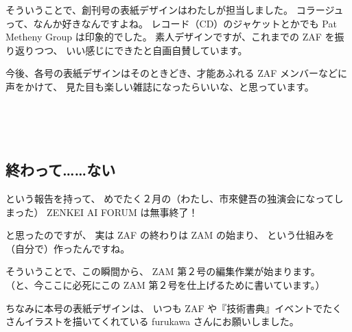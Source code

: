 \documentclass[dvipdfmx,autodetect-engine,10pt,b5paper,papersize,openany,dvipsnames]{jsbook}
\begin{document}
\vspace{8cm}

\begin{multicols}{2}

そういうことで、創刊号の表紙デザインはわたしが担当しました。
コラージュって、なんか好きなんですよね。
レコード（CD）のジャケットとかでも
Pat Metheny Group は印象的でした。
素人デザインですが、これまでの ZAF を振り返りつつ、
いい感じにできたと自画自賛しています。

今後、各号の表紙デザインはそのときどき、才能あふれる ZAF メンバーなどに声をかけて、
見た目も楽しい雑誌になったらいいな、と思っています。


\end{multicols}


\vspace{6cm}


\newpage

\begin{multicols}{2}

\section{終わって……ない}
という報告を持って、
めでたく２月の（わたし、市來健吾の独演会になってしまった）
ZENKEI AI FORUM は無事終了！

と思ったのですが、
実は ZAF の終わりは ZAM の始まり、
という仕組みを（自分で）作ったんですね。

そういうことで、この瞬間から、 ZAM 第２号の編集作業が始まります。
（と、今ここに必死にこの ZAM 第２号を仕上げるために書いています。）

ちなみに本号の表紙デザインは、
いつも ZAF や『技術書典』イベントでたくさんイラストを描いてくれている
furukawa さんにお願いしました。

\end{multicols}
\end{document}
